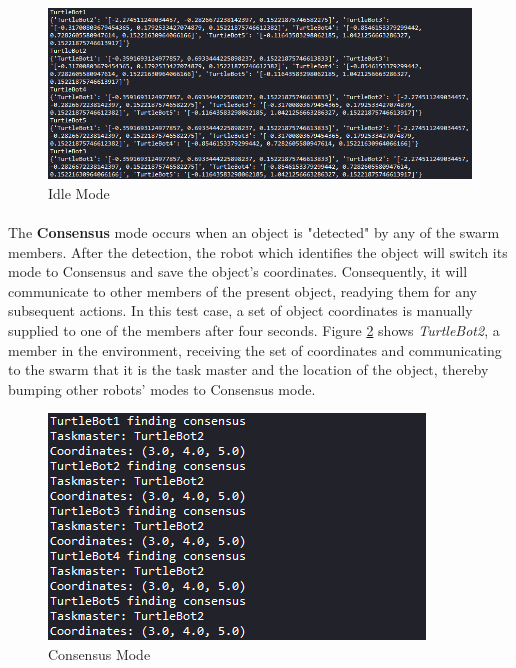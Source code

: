 \begin{figure}[H]
    \centering
    \includegraphics[width=1\linewidth]{progress_report_1/assets/images/communication/outputs/idle_mode.png}
    \caption{Idle Mode}
    \label{fig:idle_mode}
\end{figure}

\paragraph*{}
The \textbf{Consensus} mode occurs when an object is "detected" by any of the swarm members. After the detection, the robot which identifies the object will switch its mode to Consensus and save the object's coordinates. Consequently, it will communicate to other members of the present object, readying them for any subsequent actions. In this test case, a set of object coordinates is manually supplied to one of the members after four seconds. Figure \ref{fig:consensus_mode} shows \textit{TurtleBot2}, a member in the environment, receiving the set of coordinates and communicating to the swarm that it is the task master and the location of the object, thereby bumping other robots' modes to Consensus mode.

\begin{figure}[H]
    \centering
    \includegraphics[width=0.6\linewidth]{progress_report_1/assets/images/communication/outputs/consensus_mode.png}
    \caption{Consensus Mode}
    \label{fig:consensus_mode}
\end{figure}

